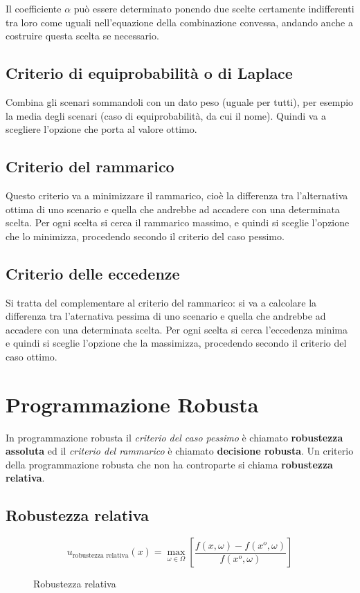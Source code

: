 \documentclass[\main/main.tex]{subfiles}
\begin{document}
Il coefficiente $\alpha$ può essere determinato ponendo due scelte certamente indifferenti tra loro come uguali nell'equazione della combinazione convessa, andando anche a costruire questa scelta se necessario.

\subsection{Criterio di equiprobabilità o di Laplace}
Combina gli scenari sommandoli con un dato peso (uguale per tutti), per esempio la media degli scenari (caso di equiprobabilità, da cui il nome). Quindi va a scegliere l'opzione che porta al valore ottimo.

\subsection{Criterio del rammarico}
Questo criterio va a minimizzare il rammarico, cioè la differenza tra l'alternativa ottima di uno scenario e quella che andrebbe ad accadere con una determinata scelta. Per ogni scelta si cerca il rammarico massimo, e quindi si sceglie l'opzione che lo minimizza, procedendo secondo il criterio del caso pessimo.

\subsection{Criterio delle eccedenze}
Si tratta del complementare al criterio del rammarico: si va a calcolare la differenza tra l'aternativa pessima di uno scenario e quella che andrebbe ad accadere con una determinata scelta. Per ogni scelta si cerca l'eccedenza minima e quindi si sceglie l'opzione che la massimizza, procedendo secondo il criterio del caso ottimo.

\section{Programmazione Robusta}
In programmazione robusta il \textit{criterio del caso pessimo} è chiamato \textbf{robustezza assoluta} ed il \textit{criterio del rammarico} è chiamato \textbf{decisione robusta}. Un criterio della programmazione robusta che non ha controparte si chiama \textbf{robustezza relativa}.

\subsection{Robustezza relativa}
\begin{figure}
  \[
    u_{\text{robustezza relativa}}(x) = \max_{\omega \in \Omega} \left[\frac{f(x, \omega) - f(x^o, \omega)}{f(x^o, \omega)}\right]
  \]
  \caption{Robustezza relativa}
\end{figure}
\end{document}
